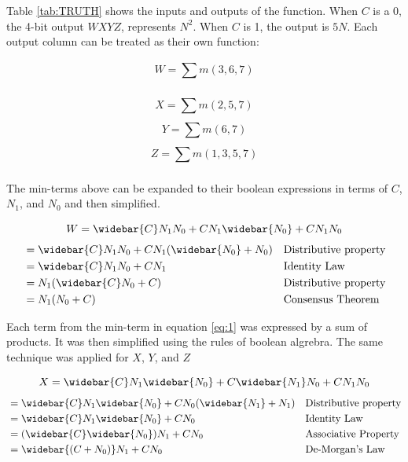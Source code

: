 \documentclass[CMPE]{KGCOEReport}
\begin{document}
Table \ref{tab:TRUTH} shows the inputs and outputs of the function. When \(C\) is a 0, the 4-bit output \(WXYZ\), represents \(N^2\). When \(C\) is 1, the output is \(5N\). Each output column can be treated as their own function:

\begin{equation}
\label{eq:1}
W = \sum_{}^{}m(3,6,7)
\end{equation}

\begin{equation}
\label{eq:2}
X = \sum_{}^{}m(2,5,7)
\end{equation}
\begin{equation}
\label{eq:3}
Y = \sum_{}^{}m(6,7)
\end{equation}
\begin{equation}
\label{eq:4}
Z = \sum_{}^{}m(1,3,5,7)
\end{equation}

The min-terms above can be expanded to their boolean expressions in terms of \(C\), \(N_1\), and \(N_0\) and then simplified.

\begin{equation*}
W = \widebar{C}N_1N_0 + CN_1\widebar{N_0} + CN_1N_0
\end{equation*}
\begin{align*}
    &= \widebar{C}N_1N_0 + CN_1(\widebar{N_0} + N_0) && \text{Distributive property}\\
    &= \widebar{C}N_1N_0 + CN_1 && \text{Identity Law}\\
    &= N_1(\widebar{C}N_0 + C) && \text{Distributive property}\\
    &= N_1(N_0 + C) && \text{Consensus Theorem}
\end{align*}

Each term from the min-term in equation \ref{eq:1} was expressed by a sum of products. It was then simplified using the rules of boolean algrebra. The same technique was applied for \(X\), \(Y\), and \(Z\)

\begin{equation*}
X = \widebar{C}N_1\widebar{N_0} + C\widebar{N_1}N_0 + CN_1N_0
\end{equation*}
\begin{align*}
    &= \widebar{C}N_1\widebar{N_0} + CN_0(\widebar{N_1} + N_1) && \text{Distributive property}\\
    &= \widebar{C}N_1\widebar{N_0} + CN_0 && \text{Identity Law}\\
    &= (\widebar{C}\widebar{N_0})N_1 + CN_0 && \text{Associative Property}\\
    &= \widebar{(C + N_0)}N_1 + CN_0 && \text{De-Morgan's Law}
\end{align*}
\end{document}

